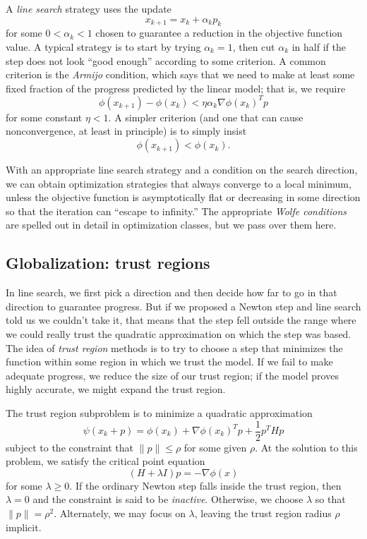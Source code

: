 \documentclass[12pt, leqno]{article}
\begin{document}
A {\em line search} strategy uses the update
\[
  x_{k+1} = x_k + \alpha_k p_k
\]
for some $0 < \alpha_k < 1$ chosen to guarantee a reduction in the
objective function value.  A typical strategy is to start by trying
$\alpha_k = 1$, then cut $\alpha_k$ in half if the step does not
look ``good enough'' according to some criterion.  A common criterion
is the {\em Armijo} condition, which says that we need to make at
least some fixed fraction of the progress predicted by the linear
model; that is, we require
\[
  \phi(x_{k+1})-\phi(x_k) < \eta \alpha_k \nabla \phi(x_k)^T p
\]
for some constant $\eta < 1$.  A simpler criterion (and one that can
cause nonconvergence, at least in principle) is to simply insist
\[
  \phi(x_{k+1}) < \phi(x_k).
\]

With an appropriate line search strategy and a condition on the
search direction, we can obtain optimization strategies that always
converge to a local minimum, unless the objective function is
asymptotically flat or decreasing in some direction so that the
iteration can ``escape to infinity.''  The appropriate {\em Wolfe
  conditions} are spelled out in detail in optimization classes,
but we pass over them here.

\subsection{Globalization: trust regions}

In line search, we first pick a direction and then decide how far to
go in that direction to guarantee progress.  But if we proposed a
Newton step and line search told us we couldn't take it, that means
that the step fell outside the range where we could really trust the
quadratic approximation on which the step was based.  The idea of {\em
  trust region} methods is to try to choose a step that minimizes the
function within some region in which we trust the model.  If we fail
to make adequate progress, we reduce the size of our trust region; if
the model proves highly accurate, we might expand the trust region.

The trust region subproblem is to minimize a quadratic approximation
\[
  \psi(x_k+p) = \phi(x_k) + \nabla \phi(x_k)^T p + \frac{1}{2} p^T H p
\]
subject to the constraint that $\|p\| \leq \rho$ for some given
$\rho$.  At the solution to this problem, we satisfy the critical
point equation
\[
  (H+\lambda I) p = -\nabla \phi(x)
\]
for some $\lambda \geq 0$.  If the ordinary Newton step falls inside
the trust region, then $\lambda = 0$ and the constraint is said to be
{\em inactive}.  Otherwise, we choose $\lambda$ so that
$\|p\| = \rho^2$.  Alternately, we may focus on $\lambda$,
leaving the trust region radius $\rho$ implicit.
\end{document}
